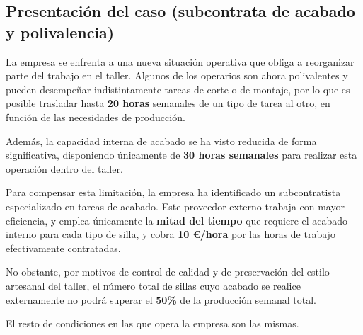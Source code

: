 \subsection{Presentación del caso (subcontrata de acabado y polivalencia)}


La empresa se enfrenta a una nueva situación operativa que obliga a reorganizar parte del trabajo en el taller. Algunos de los operarios son ahora polivalentes y pueden desempeñar indistintamente tareas de corte o de montaje, por lo que es posible trasladar hasta \textbf{20 horas} semanales de un tipo de tarea al otro, en función de las necesidades de producción.

Además, la capacidad interna de acabado se ha visto reducida de forma significativa, disponiendo únicamente de \textbf{30 horas semanales} para realizar esta operación dentro del taller. 

Para compensar esta limitación, la empresa ha identificado un subcontratista especializado en tareas de acabado. Este proveedor externo trabaja con mayor eficiencia, y emplea únicamente la \textbf{mitad del tiempo} que requiere el acabado interno para cada tipo de silla, y cobra \textbf{10 €/hora} por las horas de trabajo efectivamente contratadas. 

No obstante, por motivos de control de calidad y de preservación del estilo artesanal del taller, el número total de sillas cuyo acabado se realice externamente no podrá superar el \textbf{50\%} de la producción semanal total.

El resto de condiciones en las que opera la empresa son las mismas.


